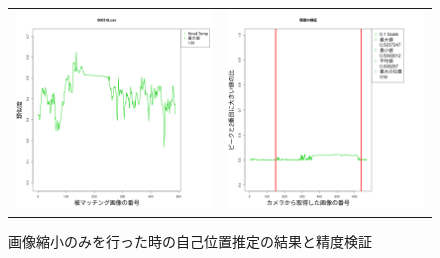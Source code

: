 \documentclass[titlepage,dvipdfmx]{jsarticle}
\begin{document}
\begin{figure}[H]
  \centering
  \begin{tabular}{cc}
    \begin{minipage}[b]{0.5\linewidth}
      \centering
      \includegraphics[pagebox=cropbox, scale=0.25]{sotuken_png/resulttemp_000318.png}
    \end{minipage}
    &
    \begin{minipage}[b]{0.5\linewidth}
      \centering
      \includegraphics[pagebox=cropbox, scale=0.25]{sotuken_png/peak/peak_temp.png}
    \end{minipage}
  \end{tabular}
  \caption{画像縮小のみを行った時の自己位置推定の結果と精度検証}
  \label{tempR}

\end{figure}
\end{document}
